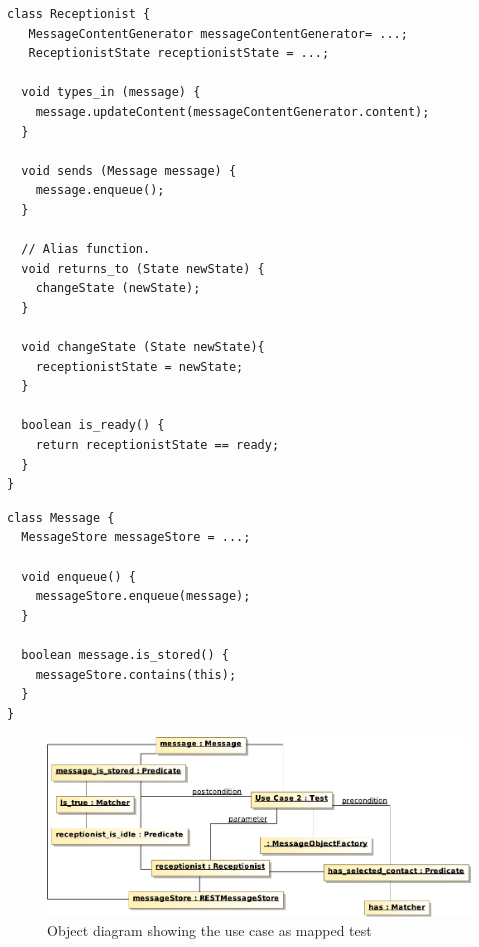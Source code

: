 \documentclass[10pt,a4paper]{article}
\begin{document}
\begin{lstlisting}[caption=Pseudo code representing Receptionist domain actor,label={lst:code_for_receptionist_domain_actor}]
class Receptionist {
   MessageContentGenerator messageContentGenerator= ...;
   ReceptionistState receptionistState = ...;
  
  void types_in (message) {
  	message.updateContent(messageContentGenerator.content);
  }
  
  void sends (Message message) {
    message.enqueue();
  }
  
  // Alias function.
  void returns_to (State newState) {
  	changeState (newState);
  }
  
  void changeState (State newState){
  	receptionistState = newState;
  }
  
  boolean is_ready() {
    return receptionistState == ready;
  }
}
\end{lstlisting}

\begin{lstlisting}[caption=Pseudo code representing Message domain concept,label={lst:code_for_domain_concept}]
class Message {
  MessageStore messageStore = ...;
  
  void enqueue() {
    messageStore.enqueue(message);
  }

  boolean message.is_stored() {
    messageStore.contains(this);
  }
}
\end{lstlisting}

\begin{figure}
 \includegraphics[scale=0.45]{img/uc2_test_config}
 \caption{Object diagram showing the use case as mapped test}
\end{figure}
\end{document}
